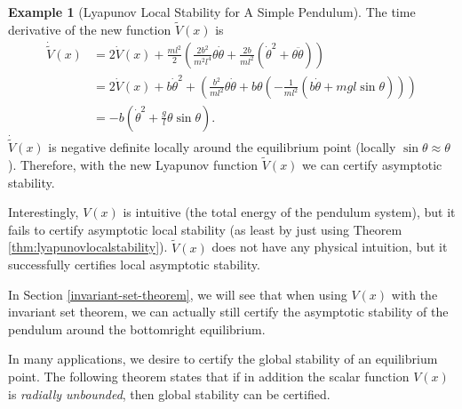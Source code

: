 \documentclass[
]{book}
\theoremstyle{definition}
\theoremstyle{definition}
\newtheorem{example}{Example}[chapter]
\theoremstyle{definition}
\theoremstyle{definition}
\theoremstyle{remark}
\begin{document}
\begin{example}[Lyapunov Local Stability for A Simple Pendulum]
The time derivative of the new function \(\tilde{V}(x)\) is
\begin{align}
\dot{\tilde{V}}(x) &= 2 \dot{V}(x) + \frac{ml^2}{2} \left( \frac{2b^2}{m^2 l^4} \theta \dot{\theta} + \frac{2b}{ml^2} (\dot{\theta}^2 + \theta \ddot{\theta})  \right) \\
& = 2\dot{V}(x) + b\dot{\theta}^2 + \left( \frac{b^2}{ml^2} \theta\dot{\theta} + b \theta \left( -\frac{1}{ml^2} (b\dot{\theta} + mgl \sin \theta) \right) \right) \\
& = -b \left( \dot{\theta}^2 + \frac{g}{l} \theta \sin \theta \right).
\end{align}
\(\dot{\tilde{V}}(x)\) is negative definite locally around the equilibrium point (locally \(\sin\theta \approx \theta\)). Therefore, with the new Lyapunov function \(\tilde{V}(x)\) we can certify asymptotic stability.

Interestingly, \(V(x)\) is intuitive (the total energy of the pendulum system), but it fails to certify asymptotic local stability (as least by just using Theorem \ref{thm:lyapunovlocalstability}). \(\tilde{V}(x)\) does not have any physical intuition, but it successfully certifies local asymptotic stability.

In Section \ref{invariant-set-theorem}, we will see that when using \(V(x)\) with the invariant set theorem, we can actually still certify the asymptotic stability of the pendulum around the bottomright equilibrium.
\end{example}

In many applications, we desire to certify the global stability of an equilibrium point. The following theorem states that if in addition the scalar function \(V(x)\) is \emph{radially unbounded}, then global stability can be certified.
\end{document}
